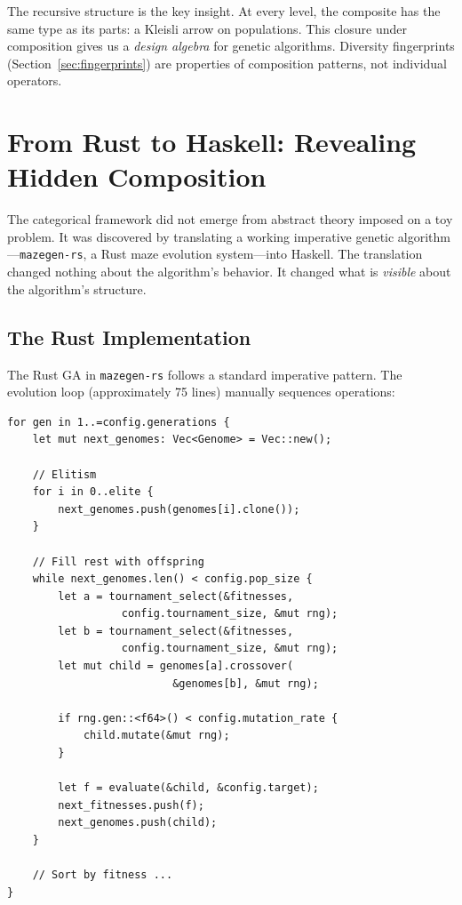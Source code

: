 \documentclass[dvipsnames,format=sigconf,anonymous=true,review=true]{acmart}
\begin{document}
The recursive structure is the key insight. At every level, the composite has the same type as its parts: a Kleisli arrow on populations. This closure under composition gives us a \emph{design algebra} for genetic algorithms. Diversity fingerprints (Section~\ref{sec:fingerprints}) are properties of composition patterns, not individual operators.

\section{From Rust to Haskell: Revealing Hidden Composition}

The categorical framework did not emerge from abstract theory imposed on a toy problem. It was discovered by translating a working imperative genetic algorithm---\texttt{mazegen-rs}, a Rust maze evolution system---into Haskell. The translation changed nothing about the algorithm's behavior. It changed what is \emph{visible} about the algorithm's structure.

\subsection{The Rust Implementation}

The Rust GA in \texttt{mazegen-rs} follows a standard imperative pattern. The evolution loop (approximately 75 lines) manually sequences operations:

\begin{lstlisting}[style=ruststyle]
for gen in 1..=config.generations {
    let mut next_genomes: Vec<Genome> = Vec::new();

    // Elitism
    for i in 0..elite {
        next_genomes.push(genomes[i].clone());
    }

    // Fill rest with offspring
    while next_genomes.len() < config.pop_size {
        let a = tournament_select(&fitnesses,
                  config.tournament_size, &mut rng);
        let b = tournament_select(&fitnesses,
                  config.tournament_size, &mut rng);
        let mut child = genomes[a].crossover(
                          &genomes[b], &mut rng);

        if rng.gen::<f64>() < config.mutation_rate {
            child.mutate(&mut rng);
        }

        let f = evaluate(&child, &config.target);
        next_fitnesses.push(f);
        next_genomes.push(child);
    }

    // Sort by fitness ...
}
\end{lstlisting}
\end{document}
